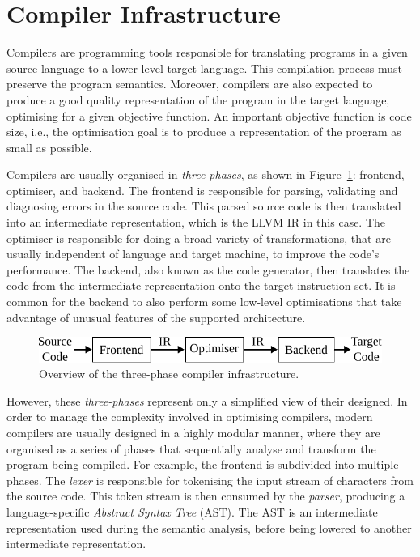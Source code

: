
\section{Compiler Infrastructure}

Compilers are programming tools responsible for translating programs in a given source language to a lower-level target language.
This compilation process must preserve the program semantics.
Moreover, compilers are also expected to produce a good quality representation of the program in the target language, optimising for a given objective function.
An important objective function is code size, i.e., the optimisation goal is to produce a representation of the program as small as possible.

Compilers are usually organised in \textit{three-phases}, as shown in Figure~\ref{fig:3-phase-compiler}: frontend, optimiser, and backend.
The frontend is responsible for parsing, validating and diagnosing errors in the source code.
This parsed source code is then translated into an intermediate representation, which is the LLVM IR in this case.
The optimiser is responsible for doing a broad variety of transformations, that are usually independent of language and target machine, to improve the code's performance.
The backend, also known as the code generator, then translates the code from the intermediate representation onto the target instruction set.
It is common for the backend to also perform some low-level optimisations that take advantage of unusual features of the supported architecture.

\begin{figure}[h]
  \centering
  \includegraphics[scale=0.9]{src/background/figs/3-phase-compiler.pdf}
  \caption{Overview of the three-phase compiler infrastructure.}
  \label{fig:3-phase-compiler}
\end{figure}

However, these \textit{three-phases} represent only a simplified view of their designed.
In order to manage the complexity involved in optimising compilers, modern compilers are usually designed in a highly modular manner, where they are organised as a series of phases that sequentially analyse and transform the program being compiled.
For example, the frontend is subdivided into multiple phases.
The \textit{lexer} is responsible for tokenising the input stream of characters from the source code.
This token stream is then consumed by the \textit{parser}, producing a language-specific \textit{Abstract Syntax Tree} (AST).
The AST is an intermediate representation used during the semantic analysis, before being lowered to another intermediate representation.

